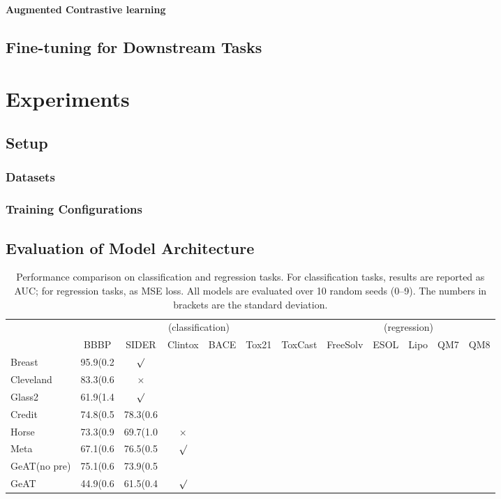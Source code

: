 \documentclass{article}
\theoremstyle{plain}
\theoremstyle{definition}
\theoremstyle{remark}
\begin{document}
\textbf{Augmented Contrastive learning}

\subsection{Fine-tuning for Downstream Tasks}

\section{Experiments}
\subsection{Setup}
\subsubsection{Datasets}
\subsubsection{Training Configurations}
\subsection{Evaluation of Model Architecture}
\begin{table}[t]
  \caption{Performance comparison on classification and regression tasks.
  For classification tasks, results are reported as AUC; for regression tasks, as MSE loss. All models are evaluated over 10 random seeds (0–9). The numbers in brackets are the standard deviation.}
  \begin{center}
    \begin{small}
      \begin{sc}
        \begin{tabular}{l|cccccc|ccccc}
          \toprule
          & \multicolumn{6}{c|}{(classification)} & \multicolumn{5}{c}{(regression)} \\
          & BBBP & SIDER & Clintox & BACE & Tox21 & ToxCast & FreeSolv & ESOL & Lipo & QM7 & QM8 \\
          \midrule
          Breast       & 95.9(0.2 & $\surd$ & & & & & & & & & \\
          Cleveland    & 83.3(0.6 & $\times$ & & & & & & & & & \\
          Glass2       & 61.9(1.4 & $\surd$ & & & & & & & & & \\
          Credit       & 74.8(0.5 & 78.3(0.6 & & & & & & & & & \\
          Horse        & 73.3(0.9 & 69.7(1.0 & $\times$ & & & & & & & & \\
          Meta         & 67.1(0.6 & 76.5(0.5 & $\surd$ & & & & & & & & \\
          \midrule
          GeAT(no pre) & 75.1(0.6 & 73.9(0.5 & & & & & & & & & \\
          GeAT         & 44.9(0.6 & 61.5(0.4 & $\surd$ & & & & & & & & \\
          \bottomrule
        \end{tabular}
      \end{sc}
    \end{small}
  \end{center}
  \vskip -0.1in
\end{table}
\end{document}
